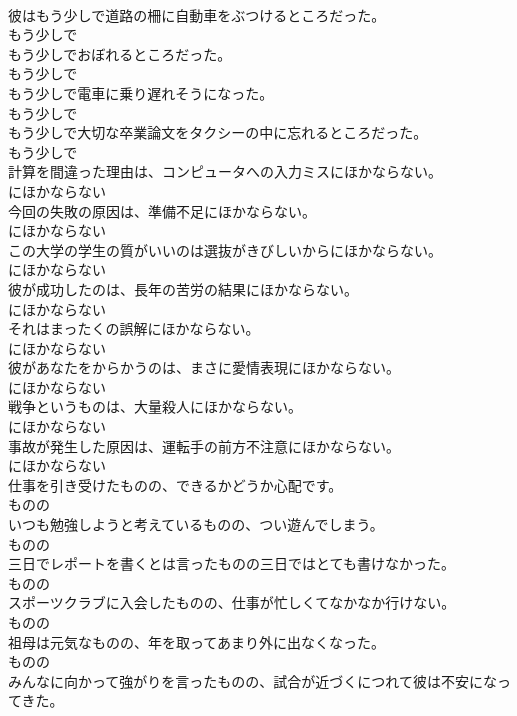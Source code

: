 \documentclass[8pt]{extreport}
\begin{document}
\begin{CJK}{UTF8}{min}
\\	彼はもう少しで道路の柵に自動車をぶつけるところだった。	
\\	もう少しで
\\	もう少しでおぼれるところだった。	
\\	もう少しで
\\	もう少しで電車に乗り遅れそうになった。	
\\	もう少しで
\\	もう少しで大切な卒業論文をタクシーの中に忘れるところだった。	
\\	もう少しで
\\	計算を間違った理由は、コンピュータへの入力ミスにほかならない。	
\\	にほかならない
\\	今回の失敗の原因は、準備不足にほかならない。	
\\	にほかならない
\\	この大学の学生の質がいいのは選抜がきびしいからにほかならない。	
\\	にほかならない
\\	彼が成功したのは、長年の苦労の結果にほかならない。	
\\	にほかならない
\\	それはまったくの誤解にほかならない。	
\\	にほかならない
\\	彼があなたをからかうのは、まさに愛情表現にほかならない。	
\\	にほかならない
\\	戦争というものは、大量殺人にほかならない。	
\\	にほかならない
\\	事故が発生した原因は、運転手の前方不注意にほかならない。	
\\	にほかならない
\\	仕事を引き受けたものの、できるかどうか心配です。	
\\	ものの
\\	いつも勉強しようと考えているものの、つい遊んでしまう。	
\\	ものの
\\	三日でレポートを書くとは言ったものの三日ではとても書けなかった。	
\\	ものの
\\	スポーツクラブに入会したものの、仕事が忙しくてなかなか行けない。	
\\	ものの
\\	祖母は元気なものの、年を取ってあまり外に出なくなった。	
\\	ものの
\\	みんなに向かって強がりを言ったものの、試合が近づくにつれて彼は不安になってきた。	

\end{CJK}
\end{document}
